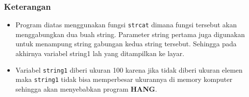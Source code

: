 \subsubsection*{Keterangan}

\begin{itemize}

\item
  Program diatas menggunakan fungsi \texttt{strcat} dimana fungsi
  tersebut akan menggabungkan dua buah string. Parameter string pertama
  juga digunakan untuk menampung string gabungan kedua string tersebut.
  Sehingga pada akhirnya variabel string1 lah yang ditampilkan ke layar.
\item
  Variabel \texttt{string1} diberi ukuran 100 karena jika tidak diberi
  ukuran elemen maka \texttt{string1} tidak bisa memperbesar ukurannya
  di memory komputer sehingga akan menyebabkan program \textbf{HANG}.
\end{itemize}


